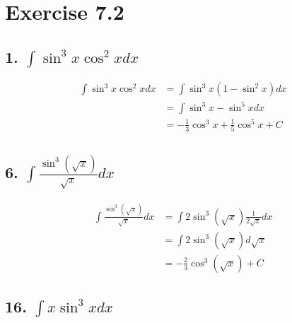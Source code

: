 \documentclass{article}
\begin{document}
    \section*{Exercise 7.2}

    \subsection*{1. $\int \sin^3 x \cos^2 x dx$}

    $$\begin{aligned}
        \int \sin^3 x \cos^2 x dx &= \int \sin^3 x (1 - \sin^2 x) dx \\
        &= \int \sin^3 x - \sin^5 x dx \\
        &= -\frac 1 3 \cos^3 x + \frac 1 5 \cos^5 x + C
    \end{aligned}$$

    \subsection*{6. $\int \frac{\sin^3(\sqrt x)}{\sqrt x} dx$}

    $$\begin{aligned}
        \int \frac{\sin^3(\sqrt x)}{\sqrt x} dx &= \int 2\sin^3(\sqrt x)\frac{1}{2\sqrt x}dx  \\
        &= \int 2\sin^3 (\sqrt x)d\sqrt x \\
        &= -\frac 2 3\cos^3 (\sqrt x) + C
    \end{aligned}$$



    \subsection*{16. $\int x\sin^3 x dx$} 
\end{document}
